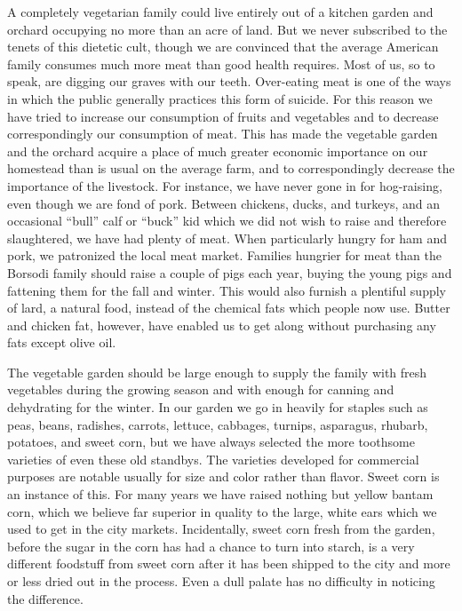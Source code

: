 \documentclass{book}
\begin{document}
A completely vegetarian family could live entirely out of a kitchen garden and orchard occupying no more than an acre of land. But we never subscribed to the tenets of this dietetic cult, though we are convinced that the average American family consumes much more meat than good health requires. Most of us, so to speak, are digging our graves with our teeth. Over-eating meat is one of the ways in which the public generally practices this form of suicide. For this reason we have tried to increase our consumption of fruits and vegetables and to decrease correspondingly our consumption of meat. This has made the vegetable garden and the orchard acquire a place of much greater economic importance on our homestead than is usual on the average farm, and to correspondingly decrease the importance of the livestock. For instance, we have never gone in for hog-raising, even though we are fond of pork. Between chickens, ducks, and turkeys, and an occasional “bull” calf or “buck” kid which we did not wish to raise and therefore slaughtered, we have had plenty of meat. When particularly hungry for ham and pork, we patronized the local meat market. Families hungrier for meat than the Borsodi family should raise a couple of pigs each year, buying the young pigs and fattening them for the fall and winter. This would also furnish a plentiful supply of lard, a natural food, instead of the chemical fats which people now use. Butter and chicken fat, however, have enabled us to get along without purchasing any fats except olive oil.

The vegetable garden should be large enough to supply the family with fresh vegetables during the growing season and with enough for canning and dehydrating for the winter. In our garden we go in heavily for staples such as peas, beans, radishes, carrots, lettuce, cabbages, turnips, asparagus, rhubarb, potatoes, and sweet corn, but we have always selected the more toothsome varieties of even these old standbys. The varieties developed for commercial purposes are notable usually for size and color rather than flavor. Sweet corn is an instance of this. For many years we have raised nothing but yellow bantam corn, which we believe far superior in quality to the large, white ears which we used to get in the city markets. Incidentally, sweet corn fresh from the garden, before the sugar in the corn has had a chance to turn into starch, is a very different foodstuff from sweet corn after it has been shipped to the city and more or less dried out in the process. Even a dull palate has no difficulty in noticing the difference.
\end{document}
